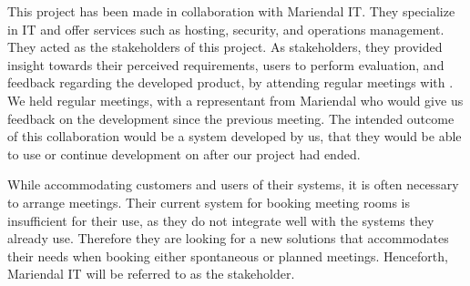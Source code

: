 This project has been made in collaboration with Mariendal IT.
They specialize in IT and offer services such as hosting, security, and operations management\cite{Mariendal_OmOs}.
They acted as the stakeholders of this project.
As stakeholders, they provided insight towards their perceived requirements, users to perform evaluation, and feedback regarding the developed product, by attending regular meetings with .
We held regular meetings, with a representant from Mariendal who would give us feedback on the development since the previous meeting.
The intended outcome of this collaboration would be a system developed by us, that they would be able to use or continue development on after our project had ended.






While accommodating customers and users of their systems, it is often necessary to arrange meetings.
Their current system for booking meeting rooms is insufficient for their use, as they do not integrate well with the systems they already use.
Therefore they are looking for a new solutions that accommodates their needs when booking either spontaneous or planned meetings. 
Henceforth, Mariendal IT will be referred to as the stakeholder. 